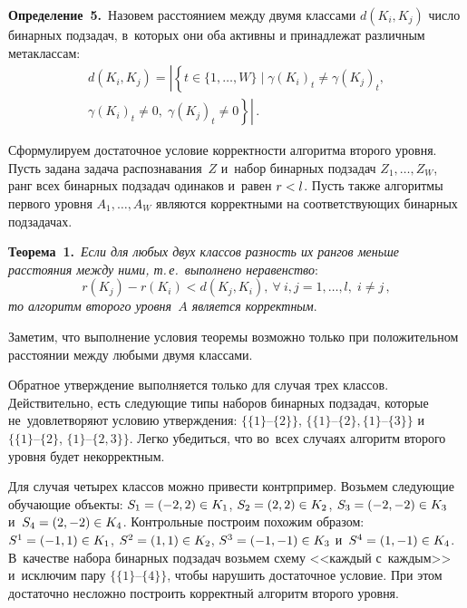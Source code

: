 \begin{multicols}{2}
\smallskip

\noindent
\textbf{Определение~5.}\
Назовем расстоянием между двумя классами $d(K_i, K_j)$ число бинарных 
подзадач, в~которых они оба активны и принадлежат различным метаклассам:
\begin{multline*}
d(K_i, K_j) = \left| \left\{ t\in\{1,\ldots,W\} \;|\; 
\gamma(K_i)_t\neq\gamma(K_j)_t,\right.\right.\\
\left.\left. \gamma(K_i)_t\neq 0,\; 
\gamma(K_j)_t\neq 0 \right\} \right|\,.
\end{multline*}


Сформулируем достаточное условие коррект\-ности алгоритма второго уровня.
Пусть задана задача распознавания~$Z$ и~набор бинарных подзадач $Z_1,\ldots,Z_W$, 
ранг всех бинарных подзадач одинаков и~равен $r\hm<l$.
Пусть также алгоритмы первого уровня $A_1,\ldots,A_W$ являются корректными 
на соответствующих бинарных подзадачах.


\smallskip
\noindent
\textbf{Теорема~1.}\
\textit{Если для любых двух классов разность их рангов меньше расстояния 
между ними, т.\,е.\ выполнено неравенство}:
\begin{equation*}
r(K_j) - r(K_i) < d(K_j,K_i),\ \forall\ i,j=1,\ldots,l,\; i\neq j\,,
\end{equation*}
\textit{то алгоритм второго уровня~$A$ является корректным}.


\smallskip

Заметим, что выполнение условия теоремы 
возможно только при положительном расстоянии между любыми двумя классами.

Обратное утверждение выполняется только для случая трех классов.
Действительно, есть следующие типы наборов бинарных подзадач, 
которые не~удовлетворяют условию утверждения: $\{\{1\}\mbox{--}\{2\}\}$, 
$\{\{1\}\mbox{--}\{2\}, \{1\}\mbox{--}\{3\}\}$ 
и~$\{\{1\}\mbox{--}\{2\}$, $\{1\}\mbox{--}\{2,3\}\}$.
Легко убедиться, что во~всех случаях алгоритм второго уровня будет некорректным.

Для случая четырех классов можно привести контрпример.
Возьмем следующие обучающие объекты: $S_1\hm=(-2, 2)\hm\in K_1$, 
$S_2\hm=(2, 2)\hm\in K_2$, $S_3\hm=(-2, -2)\hm\in K_3$ и~$S_4\hm=(2, -2)\hm\in K_4$.
Контрольные построим похожим образом: $S^1\hm=(-1, 1)\hm\in K_1$, 
$S^2=(1, 1)\hm\in K_2$, $S^3\hm=(-1, -1)\hm\in K_3$ и~$S^4\hm=(1, -1)\hm\in K_4$.
В~качестве набора бинарных подзадач возьмем схему <<каждый с~каждым>> 
и~исключим пару $\{\{1\}\mbox{--}\{4\}\}$, чтобы нарушить достаточное условие.
При этом достаточно несложно построить корректный алгоритм второго уровня.


\end{multicols}
